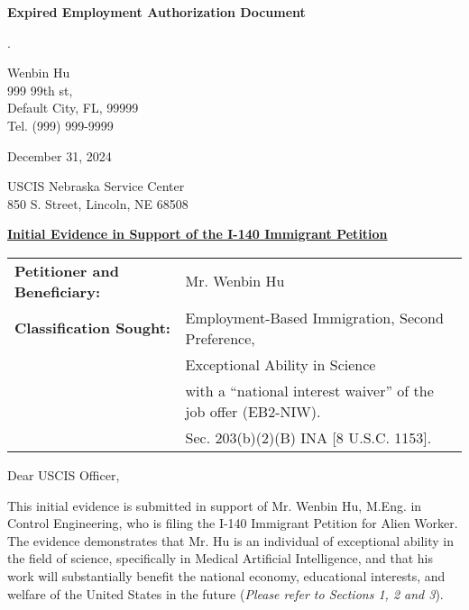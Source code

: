 \documentclass{article}
\begin{document}
% 

\vspace*{\fill}
\begin{center}

{\LARGE \bf
Expired Employment Authorization Document
}

\end{center}
\vspace*{\fill}

.

% 



\begin{flushright}
Wenbin Hu\\
999 99th st,\\
Default City, FL, 99999\\
Tel. (999) 999-9999
\end{flushright}

December 31, 2024

\label{IE}

USCIS Nebraska Service Center\\
850 S. Street, Lincoln, NE 68508

\underline{\bf Initial Evidence in Support of the I-140 Immigrant Petition}

\begin{tabular}{ll}
{\bf Petitioner and Beneficiary:} & Mr. Wenbin Hu \\
{\bf Classification Sought:} & Employment-Based Immigration, Second Preference, \\
& Exceptional Ability in Science \\
& with a “national interest waiver” of the job offer (EB2-NIW).\\
& Sec. 203(b)(2)(B) INA [8 U.S.C. 1153].
\end{tabular}
\vspace{2\baselineskip}

Dear USCIS Officer,

This initial evidence is submitted in support of Mr. Wenbin Hu, M.Eng. in Control Engineering, who is filing the I-140 Immigrant Petition for Alien Worker. The evidence demonstrates that Mr. Hu is an individual of exceptional ability in the field of science, specifically in Medical Artificial Intelligence, and that his work will substantially benefit the national economy, educational interests, and welfare of the United States in the future ({\it Please refer to Sections 1, 2 and 3}).
\end{document}
